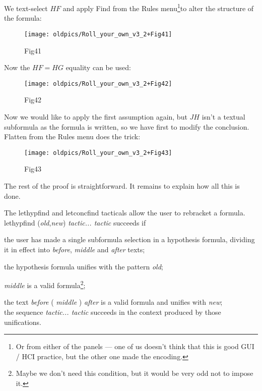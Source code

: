 We text-select $HF$ and apply Find from the Rules menu\footnote{Or from either of the panels --- one of us doesn't think that this is good GUI / HCI practice, but the other one made the encoding.}to alter the structure of the formula:

\begin{figure}[htbp] \begin{center} \texttt{[image: oldpics/Roll\_your\_own\_v3\_2+Fig41]} \caption{Fig41} \end{center} \end{figure}


Now the $HF=HG$ equality can be used:

\begin{figure}[htbp] \begin{center} \texttt{[image: oldpics/Roll\_your\_own\_v3\_2+Fig42]} \caption{Fig42} \end{center} \end{figure}


Now we would like to apply the first assumption again, but $JH$ isn't a textual subformula as the formula is written, so we have first to modify the conclusion. Flatten from the Rules menu does the trick:

\begin{figure}[htbp] \begin{center} \texttt{[image: oldpics/Roll\_your\_own\_v3\_2+Fig43]} \caption{Fig43} \end{center} \end{figure}


The rest of the proof is straightforward. It remains to explain how all this is done.


The lethypfind and letconcfind tacticals allow the user to rebracket a formula. lethypfind (\textit{old},\textit{new}) \textit{tactic... tactic} succeeds if


{\textbullet}\tab the user has made a single subformula selection in a hypothesis formula, dividing it in effect into \textit{before}, \textit{middle} and \textit{after} texts;


{\textbullet}\tab the hypothesis formula unifies with the pattern \textit{old};


{\textbullet}\tab \textit{middle} is a valid formula\footnote{Maybe we don't need this condition, but it would be very odd not to impose it.};


{\textbullet}\tab the text \textit{before} ( \textit{middle} ) \textit{after} is a valid formula and unifies with \textit{new};\\
{\textbullet}\tab the sequence \textit{tactic... tactic} succeeds in the context produced by those unifications.


